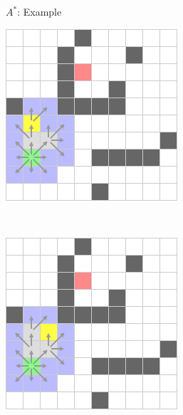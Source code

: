 \documentclass{presentation}
\begin{document}
\begin{frame}{$A^*$: Example}
\begin{minipage}{0.23\textwidth}
	\end{minipage}%
	\hfill%
	\begin{minipage}{0.23\textwidth}
		\includegraphics[width=\textwidth]{figures/A-Stern_geschnitten(241x241)/5.png}
	\end{minipage}\\
	\vspace{2mm}
	\begin{minipage}{0.23\textwidth}
		\includegraphics[width=\textwidth]{figures/A-Stern_geschnitten(241x241)/6.png}

\end{minipage}
\end{frame}
\end{document}
